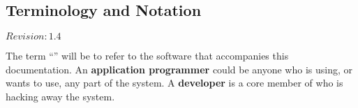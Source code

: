 \subsection{Terminology and Notation}

$Revision: 1.4 $

The term ``{\marf}'' will be
to refer to the software that accompanies this
documentation.
An {\bf application programmer}
could be anyone who is using, or wants to use, any part of the
{\marf} system.
A {\bf {\marf} developer}
is a core member of {\marf} who is hacking away the
{\marf} system.

